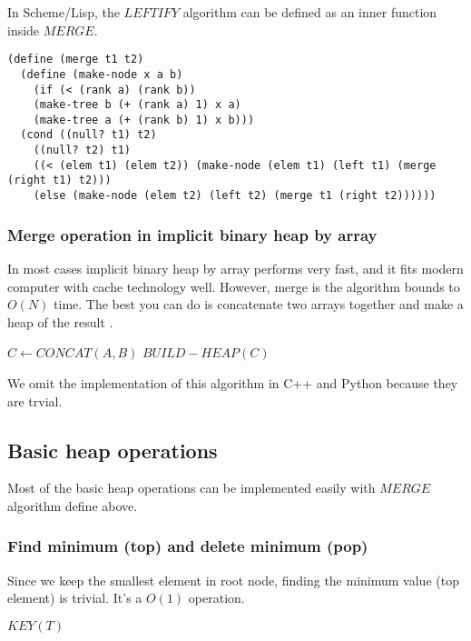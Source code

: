 \documentclass{article}
\begin{document}
In Scheme/Lisp, the $LEFTIFY$ algorithm can be defined as an
inner function inside $MERGE$.

\lstset{language=lisp}
\begin{lstlisting}
(define (merge t1 t2)
  (define (make-node x a b)
    (if (< (rank a) (rank b))
	(make-tree b (+ (rank a) 1) x a)
	(make-tree a (+ (rank b) 1) x b)))
  (cond ((null? t1) t2)
	((null? t2) t1)
	((< (elem t1) (elem t2)) (make-node (elem t1) (left t1) (merge (right t1) t2)))
	(else (make-node (elem t2) (left t2) (merge t1 (right t2))))))
\end{lstlisting}

\subsubsection{Merge operation in implicit binary heap by array}

In most cases implicit binary heap by array performs very fast, and
it fits modern computer with cache technology well. However, merge
is the algorithm bounds to $O(N)$ time. The best you can do is 
concatenate two arrays together and make a heap of the result \cite{NIST}.

\begin{algorithmic}[1]
  $C \gets CONCAT(A, B)$
  $BUILD-HEAP(C)$
\EndFunction
\end{algorithmic}

We omit the implementation of this algorithm in C++ and Python because 
they are trvial.

\subsection{Basic heap operations}

Most of the basic heap operations can be implemented easily with $MERGE$
algorithm define above.

\subsubsection{Find minimum (top) and delete minimum (pop)}
Since we keep the smallest element in root node, finding the minimum
value (top element) is trivial. It's a $O(1)$ operation.

\begin{algorithmic}[1]
  \State \Return $KEY(T)$
\EndFunction
\end{algorithmic}
\end{document}
